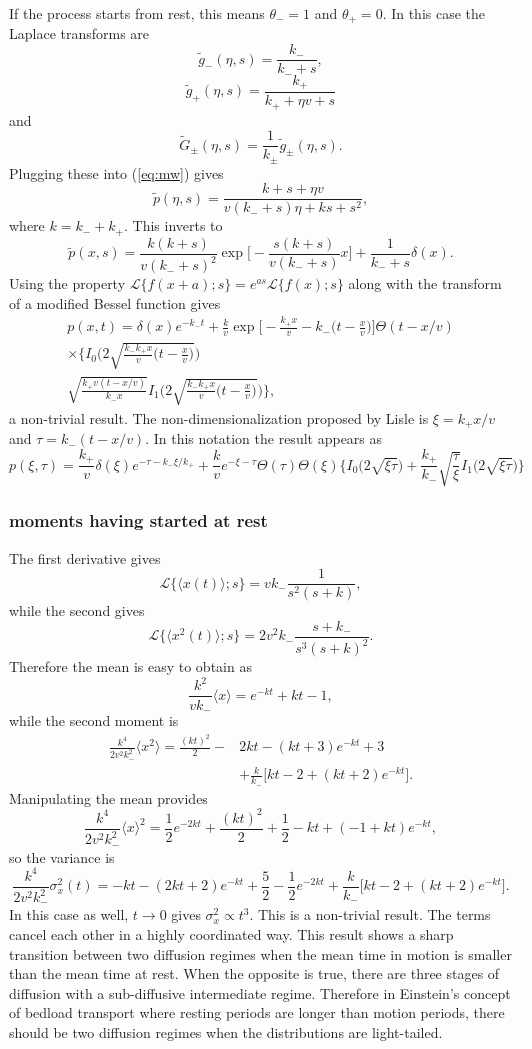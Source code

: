 \documentclass[11pt]{article}
\newcommand\be{\begin{equation}} %
\newcommand\ee{\end{equation}}   %
\newcommand\bra{\langle}
\newcommand\ket{\rangle}
\newcommand\El{\mathcal{L}}
\newcommand\tg{\tilde{g}}
\newcommand\tG{\tilde{G}}
\begin{document}
If the process starts from rest, this means $\theta_- = 1$ and $\theta_+=0$.
In this case the Laplace transforms are
\be \tg_-(\eta,s) = \frac{k_-}{k_- + s}, \ee 
\be \tg_+(\eta,s) = \frac{k_+}{k_+ + \eta v + s }\ee
and
\be \tG_\pm(\eta,s) = \frac{1}{k_\pm}\tg_\pm(\eta,s).\ee
Plugging these into (\ref{eq:mw}) gives
\be \tilde{p}(\eta,s) = \frac{k + s + \eta v }{v(k_-+s) \eta  + k s + s^2 },\ee
where $k = k_- + k_+$. 
This inverts to 
\be \tilde{p}(x,s) = \frac{k(k+s)}{v(k_-+s)^2} \exp\Big[-\frac{s(k+s)}{v(k_-+s)}x\Big] + \frac{1}{k_-+s}\delta(x) .\ee
Using the property $ \El\{f(x+a);s\} = e^{as}\El\{f(x);s\}$ along with the transform of a modified Bessel function gives
\begin{multline}
p(x,t) = \delta(x) e^{-k_- t} + \frac{k}{v}\exp\Big[-\frac{k_+x }{v} - k_-\Big(t-\frac{x}{v}\Big)\Big]\Theta(t-x/v)\\ 
\times \Big\{ I_0\Big(2\sqrt{\frac{k_-k_+x}{v}\big(t-\frac{x}{v}\big)}\Big) \\
\sqrt{\frac{k_+ v(t-x/v)}{k_-x}}I_1\Big(2\sqrt{\frac{k_-k_+x}{v}\big(t-\frac{x}{v}\big)}\Big) 
\Big\},
\end{multline}
a non-trivial result.
The non-dimensionalization proposed by Lisle is $\xi = k_+ x /v$ and $\tau = k_-(t-x/v)$.
In this notation the result appears as
\be p(\xi,\tau) = \frac{k_+}{v}\delta(\xi)e^{-\tau-k_-\xi/k_+} +  \frac{k}{v}e^{-\xi-\tau}\Theta(\tau)\Theta(\xi)\Big\{I_0\big(2\sqrt{\xi \tau}\big) +\frac{k_+}{k_-}\sqrt{\frac{\tau}{\xi}}I_1\big(2\sqrt{\xi\tau}\big) \Big\}\ee

\subsubsection{moments having started at rest}
The first derivative gives 
\be \El\{\bra x(t) \ket;s\} = vk_- \frac{1}{s^2(s+k)},\ee
while the second gives 
\be \El\{\bra x^2(t) \ket ; s\} = 2 v^2 k_- \frac{s+k_-}{s^3(s+k)^2}. \ee
Therefore the mean is easy to obtain as 
\be \frac{k^2}{vk_-} \bra x \ket = e^{-kt} + kt -1, \label{eq:meanz}\ee
while the second moment is 
\begin{align}
 \frac{k^4}{2 v^2 k_-^2} \bra x^2\ket = \frac{(kt)^2}{2} - &2kt - (kt+3)e^{-kt} + 3 \\ 
 &+ \frac{k}{k_-}\big[kt -2 + (kt+2)e^{-kt}\big]. \label{eq:2ndmoment}
\end{align}
Manipulating the mean provides 
\be \frac{k^4}{2v^2k_-^2}\bra x \ket^2 = \frac{1}{2}e^{-2kt} + \frac{(kt)^2}{2} + \frac{1}{2} -kt + (-1 + kt)e^{-kt}, \ee
so the variance is 
\be \frac{k^4}{2v^2k_-^2} \sigma_x^2(t) = -kt -(2kt + 2)e^{-kt} + \frac{5}{2} - \frac{1}{2}e^{-2kt} + \frac{k}{k_-}\big[kt-2 + (kt +2)e^{-kt}\big].\ee
In this case as well, $t\rightarrow 0$ gives $\sigma_x^2 \propto t^3$.
This is a non-trivial result. The terms cancel each other in a highly coordinated way.
This result shows a sharp transition between two diffusion regimes when the mean time in motion is smaller than the mean time at rest.
When the opposite is true, there are three stages of diffusion with a sub-diffusive intermediate regime.
Therefore in Einstein's concept of bedload transport where resting periods are longer than motion periods, there should be two diffusion regimes when the distributions are light-tailed.
\end{document}
